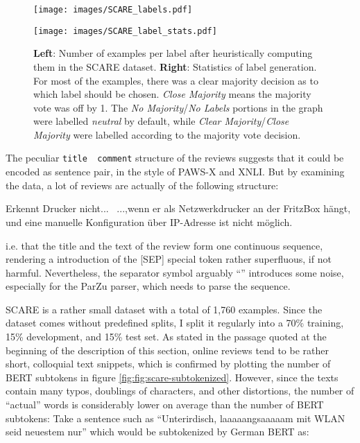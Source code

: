 \begin{figure}
  \begin{minipage}{0.45\linewidth}
  \vspace{0pt}
    \texttt{[image: images/SCARE\_labels.pdf]}
  \end{minipage}
  \hfill
  \begin{minipage}{0.45\linewidth}
  \vspace{0pt}
    \texttt{[image: images/SCARE\_label\_stats.pdf]}
  \end{minipage}
  \caption[Accumulated Gains and Losses.]{\textbf{Left}: Number of examples per label after heuristically computing them in the SCARE dataset. \textbf{Right}: Statistics of label generation. For most of the examples, there was a clear majority decision as to which label should be chosen. \emph{Close Majority} means the majority vote was off by 1. The \emph{No Majority}/\emph{No Labels} portions in the graph were labelled \emph{neutral} by default, while \emph{Clear Majority}/\emph{Close Majority}  were labelled according to the majority vote decision.}
  \label{fig:scare-stats}
\end{figure}


The peculiar \texttt{title \textbar \textbar\ comment} structure of the reviews suggests that it
could be encoded as sentence pair, in the style of PAWS-X and XNLI. But by examining the data, a
lot of reviews are actually of the following structure:

\begin{examples}
  \item Erkennt Drucker nicht... \textbar \textbar\ ...,wenn er als Netzwerkdrucker an der FritzBox hängt, und eine manuelle Konfiguration über IP-Adresse ist nicht möglich.
\end{examples}

i.e. that the title and the text of the review form one continuous sequence, rendering a introduction
of the [SEP] special token rather superfluous, if not harmful. Nevertheless, the
separator symbol arguably ``\textbar \textbar'' introduces some noise, especially for the ParZu
parser, which needs to parse the sequence.



SCARE is a rather small dataset with a total of 1,760 examples. Since the dataset comes
without predefined splits, I split it regularly into a 70\% training, 15\% development,
and 15\% test set. As \citeauthor{sanger2016scare} stated in the passage quoted at the
beginning of the description of this section, online reviews tend to be rather short,
colloquial text snippets, which is confirmed by plotting the number of BERT subtokens in
figure \ref{fig:fig:scare-subtokenized}. However, since the texts contain many typos,
doublings of characters, and other distortions, the number of ``actual'' words is
considerably lower on average than the number of BERT subtokens: Take a sentence such
as ``Unterirdisch, laaaaangsaaaaam mit WLAN seid neuestem nur'' which would be subtokenized by German BERT as:

